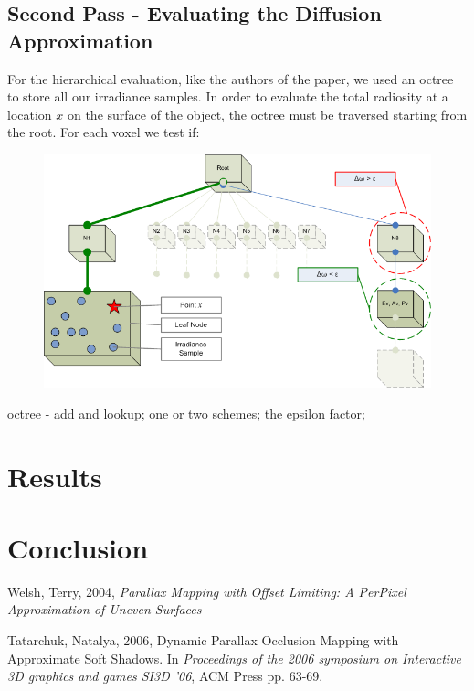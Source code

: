 \documentclass{article}
\begin{document}
\subsection{Second Pass - Evaluating the Diffusion Approximation}

For the hierarchical evaluation, like the authors of the paper, we used an octree to store all our irradiance samples. In order to evaluate the total radiosity at a location $x$ on the surface of the object, the octree must be traversed starting from the root. For each voxel we test if:


\begin{figure}[tbh]
\centering
\includegraphics[scale=0.5]{./Pictures/Octree.png}
\caption{}
\label{Hierarchical Evaluation}
\end{figure}

octree - add and lookup; one or two schemes; the epsilon factor;

\section{Results}
\section{Conclusion}

\begin{thebibliography}{99}

%
%

 Welsh, Terry, 2004, {\it Parallax Mapping with Offset Limiting: A PerPixel Approximation of Uneven Surfaces}

 Tatarchuk, Natalya, 2006, Dynamic Parallax Occlusion Mapping with Approximate Soft Shadows. In {\it Proceedings of the 2006 symposium on Interactive 3D graphics and games SI3D '06}, ACM Press pp. 63-69.

\end{thebibliography}
\end{document}
